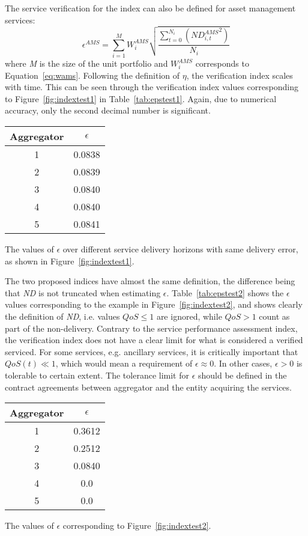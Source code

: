 The service verification for the index can also be defined for asset management services:
\begin{equation}\label{eq:epsilonAMSmain}
	\epsilon^{AMS} = \sum^{M}_{i=1} W^{AMS}_i \sqrt{\frac{\sum^{N_i}_{t=0} \left( {ND^{AMS}_{i,t}}^{2} \right)}{N_i}}
\end{equation}
where  \emph{M} is the size of the unit portfolio and $W^{AMS}_i$ corresponds to Equation~\eqref{eq:wams}. Following the definition of $\eta$, the verification index scales with time. This can be seen through the verification index values corresponding to Figure~\ref{fig:indextest1} in Table~\ref{tab:epstest1}. Again, due to numerical accuracy, only the second decimal number is significant.
\begin{margintable}%
	\centering
	\begin{tabular}{cc}
		\toprule
		Aggregator & $\epsilon$ \\
		\midrule
		1 & 0.0838 \\
		2 & 0.0839  \\
		3 & 0.0840  \\
		4 & 0.0840  \\
		5 & 0.0841 \\
		\bottomrule
	\end{tabular}
	\caption{The values of $\epsilon$ over different service delivery horizons with same delivery error, as shown in Figure~\ref{fig:indextest1}.}
	\label{tab:epstest1}
\end{margintable}

The two proposed indices have almost the same definition, the difference being that \emph{ND} is not truncated when estimating $\epsilon$. Table~\ref{tab:epstest2} shows the $\epsilon$ values corresponding to the example in Figure~\ref{fig:indextest2}, and shows clearly the definition of \emph{ND}, i.e. values $QoS \leq 1$ are ignored, while $QoS > 1$ count as part of the non-delivery. Contrary to the service performance assessment index, the verification index does not have a clear limit for what is considered a verified serviced. For some services, e.g. ancillary services, it is critically important that $QoS(t) \ll 1$, which would mean a requirement of $\epsilon \approx 0$. In other cases, $\epsilon > 0$ is tolerable to certain extent. The tolerance limit for $\epsilon$ should be defined in the contract agreements between aggregator and the entity acquiring the services.

\begin{margintable}[-5\baselineskip]%
	\centering
	\begin{tabular}{cc}
		\toprule
		Aggregator & $\epsilon$ \\
		\midrule
		1 & 0.3612 \\
		2 & 0.2512  \\
		3 & 0.0840  \\
		4 & 0.0  \\
		5 & 0.0 \\
		\bottomrule
	\end{tabular}
	\caption{The values of $\epsilon$ corresponding to Figure~\ref{fig:indextest2}.}
	\label{tab:epstest2}
\end{margintable}

